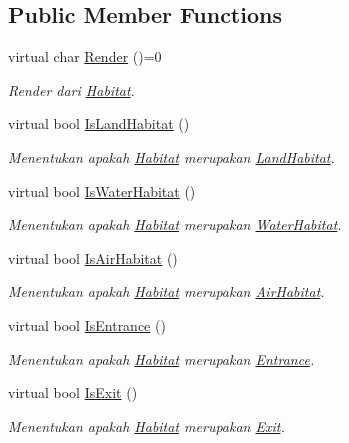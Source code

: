 \subsection*{Public Member Functions}
\begin{DoxyCompactItemize}
\item 
virtual char \hyperlink{classHabitat_ad1bf10205d38e8e308eb9acc3aa2872c}{Render} ()=0
\begin{DoxyCompactList}\small\item\em Render dari \hyperlink{classHabitat}{Habitat}. \end{DoxyCompactList}\item 
virtual bool \hyperlink{classHabitat_aaf69aab7e1ce1075188651d2cb388b6b}{Is\+Land\+Habitat} ()
\begin{DoxyCompactList}\small\item\em Menentukan apakah \hyperlink{classHabitat}{Habitat} merupakan \hyperlink{classLandHabitat}{Land\+Habitat}. \end{DoxyCompactList}\item 
virtual bool \hyperlink{classHabitat_acfdb3e3911d536c5564c91d60c368fc4}{Is\+Water\+Habitat} ()
\begin{DoxyCompactList}\small\item\em Menentukan apakah \hyperlink{classHabitat}{Habitat} merupakan \hyperlink{classWaterHabitat}{Water\+Habitat}. \end{DoxyCompactList}\item 
virtual bool \hyperlink{classHabitat_aef29f87fdc6be7ae4e44279d816e173b}{Is\+Air\+Habitat} ()
\begin{DoxyCompactList}\small\item\em Menentukan apakah \hyperlink{classHabitat}{Habitat} merupakan \hyperlink{classAirHabitat}{Air\+Habitat}. \end{DoxyCompactList}\item 
virtual bool \hyperlink{classHabitat_aedc03784a83bef591a2441d1c062cd57}{Is\+Entrance} ()
\begin{DoxyCompactList}\small\item\em Menentukan apakah \hyperlink{classHabitat}{Habitat} merupakan \hyperlink{classEntrance}{Entrance}. \end{DoxyCompactList}\item 
virtual bool \hyperlink{classHabitat_aece5f38292630cf5860001ae8fdd084d}{Is\+Exit} ()
\begin{DoxyCompactList}\small\item\em Menentukan apakah \hyperlink{classHabitat}{Habitat} merupakan \hyperlink{classExit}{Exit}. \end{DoxyCompactList}\item 

\end{DoxyCompactItemize}
